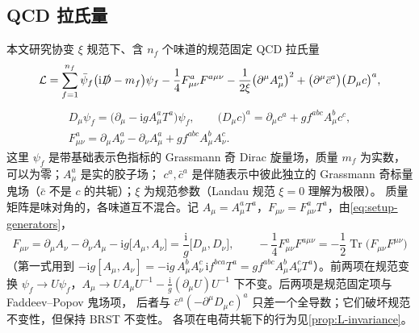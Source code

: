 \documentclass[UTF8,a4paper,11pt,fontset=fandol]{ctexart}
\theoremstyle{cplain}
\theoremstyle{cdefinition}
\theoremstyle{cremark}
\numberwithin{equation}{section}
\DeclareMathOperator{\Tr}{Tr}
\newcommand{\sla}[1]{\slashed{#1}}                  %
\newcommand{\ii}{\mathrm{i}}                        %
\begin{document}
\subsection{QCD 拉氏量}\label{sec:setup-lagrangian}

本文研究协变 $\xi$ 规范下、含 $n_f$ 个味道的规范固定 QCD 拉氏量
\begin{equation}\label{eq:lagrangian}
\mathcal L=\sum_{f=1}^{n_f}\bar\psi_f\bigl(\ii\sla D-m_f\bigr)\psi_f-\frac14F^a_{\mu\nu}F^{a\mu\nu}
-\frac{1}{2\xi}\bigl(\partial^\mu A^a_\mu\bigr)^2+\bigl(\partial^\mu\bar c^a\bigr)\bigl(D_\mu c\bigr)^a ,
\end{equation}
\begin{equation}\label{eq:setup-covariant}
\begin{gathered}
D_\mu\psi_f=\bigl(\partial_\mu-\ii gA^a_\mu T^a\bigr)\psi_f,\qquad
\bigl(D_\mu c\bigr)^a=\partial_\mu c^a+gf^{abc}A^b_\mu c^c,\\
F^a_{\mu\nu}=\partial_\mu A^a_\nu-\partial_\nu A^a_\mu+gf^{abc}A^b_\mu A^c_\nu .
\end{gathered}
\end{equation}
这里 $\psi_f$ 是带基础表示色指标的 Grassmann 奇 Dirac 旋量场，质量 $m_f$ 为实数，可以为零；$A^a_\mu$ 是实的胶子场；
$c^a,\bar c^a$ 是伴随表示中彼此独立的 Grassmann 奇标量鬼场（$\bar c$ 不是 $c$ 的共轭）；$\xi$ 为规范参数（Landau 规范 $\xi=0$ 理解为极限）。
质量矩阵是味对角的，各味道互不混合。记 $A_\mu=A^a_\mu T^a$，$F_{\mu\nu}=F^a_{\mu\nu}T^a$，由\cref{eq:setup-generators}，
\begin{equation}\label{eq:setup-Fmatrix}
F_{\mu\nu}=\partial_\mu A_\nu-\partial_\nu A_\mu-\ii g\bigl[A_\mu,A_\nu\bigr]=\frac{\ii}{g}\bigl[D_\mu,D_\nu\bigr],\qquad
-\frac14F^a_{\mu\nu}F^{a\mu\nu}=-\frac12\Tr\bigl(F_{\mu\nu}F^{\mu\nu}\bigr)
\end{equation}
（第一式用到 $-\ii g[A_\mu,A_\nu]=-\ii g\,A^b_\mu A^c_\nu\,\ii f^{bca}T^a=gf^{abc}A^b_\mu A^c_\nu T^a$）。前两项在规范变换
$\psi_f\to U\psi_f$，$A_\mu\to UA_\mu U^{-1}-\tfrac{\ii}{g}(\partial_\mu U)U^{-1}$ 下不变。后两项是规范固定项与 Faddeev--Popov 鬼场项\cite{FaddeevPopov1967}，
后者与 $\bar c^a(-\partial^\mu D_\mu c)^a$ 只差一个全导数\cite[第 16 章]{PeskinSchroeder1995}；它们破坏规范不变性，但保持 BRST 不变性\cite{BRS1976,Tyutin1975}。
各项在电荷共轭下的行为见\cref{prop:L-invariance}。
\end{document}
